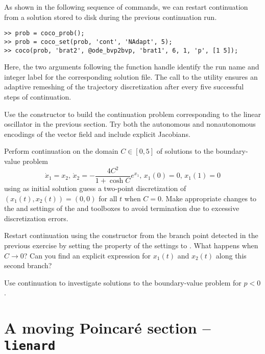 As shown in the following sequence of commands, we can restart continuation from a solution stored to disk during the previous continuation run. 
\begin{lstlisting}[language=coco-highlight]
>> prob = coco_prob();
>> prob = coco_set(prob, 'cont', 'NAdapt', 5);
>> coco(prob, 'brat2', @ode_bvp2bvp, 'brat1', 6, 1, 'p', [1 5]);
\end{lstlisting}
Here, the two arguments following the  function handle identify the run name and integer label for the corresponding solution file. The call to the  utility ensures an adaptive remeshing of the trajectory discretization after every five successful steps of continuation.\\
\medskip

\begin{exercises}
\item Use the  constructor to build the continuation problem corresponding to the linear oscillator in the previous section. Try both the autonomous and nonautonomous encodings of the vector field and include explicit Jacobians.

\item Perform continuation on the domain $C\in[0,5]$ of solutions to the boundary-value problem
\[
\dot{x}_1=x_2,\,\dot{x}_2=-\frac{4C^2}{1+\cosh C}e^{x_1},\,x_1(0)=0,\,x_1(1)=0
\]
using as initial solution guess a two-point discretization of $(x_1(t),x_2(t))=(0,0)$ for all $t$ when $C=0$. Make appropriate changes to the  and  settings of the  and  toolboxes to avoid termination due to excessive discretization errors.

\item Restart continuation using the  constructor from the branch point detected in the previous exercise by setting the  property of the  settings to . What happens when $C\rightarrow 0$? Can you find an explicit expression for $x_1(t)$ and $x_2(t)$ along this second branch?

\item Use continuation to investigate solutions to the boundary-value problem for $p<0$.
\end{exercises}


\section{A moving Poincar\'{e} section -- \texttt{lienard}}

